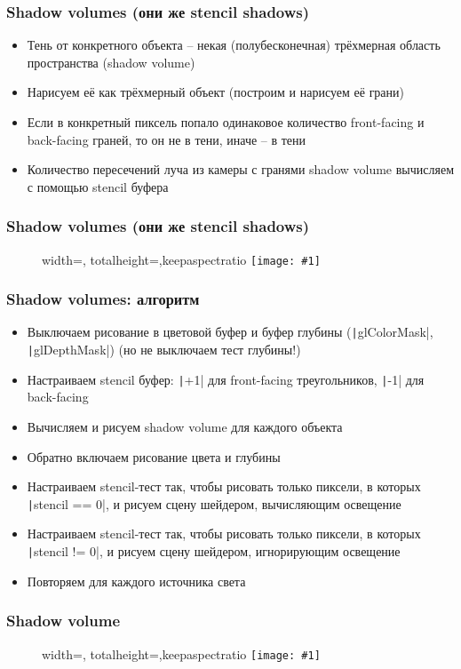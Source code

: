 \documentclass[10pt]{beamer}
\newcommand{\slideimage}[1]{
  \begin{figure}
    \begin{adjustbox}{width=\textwidth, totalheight=\textheight-2\baselineskip-2\baselineskip,keepaspectratio}
      \texttt{[image: \#1]}
    \end{adjustbox}
  \end{figure}
}
\begin{document}
\begin{frame}[fragile]
\frametitle{Shadow volumes (они же stencil shadows)}
\begin{itemize}
\item Тень от конкретного объекта -- некая (полубесконечная) трёхмерная область пространства (shadow volume)
\pause
\item Нарисуем её как трёхмерный объект (построим и нарисуем её грани)
\pause
\item Если в конкретный пиксель попало одинаковое количество front-facing и back-facing граней, то он не в тени, иначе -- в тени
\pause
\item Количество пересечений луча из камеры с гранями shadow volume вычисляем с помощью stencil буфера
\end{itemize}
\end{frame}

\begin{frame}[fragile]
\frametitle{Shadow volumes (они же stencil shadows)}
\slideimage{shadow-volumes-scheme.png}
\end{frame}

\begin{frame}[fragile]
\frametitle{Shadow volumes: алгоритм}
\begin{itemize}
\item Выключаем рисование в цветовой буфер и буфер глубины (\texttt|glColorMask|, \texttt|glDepthMask|) (но не выключаем тест глубины!)
\pause
\item Настраиваем stencil буфер: \texttt|+1| для front-facing треугольников, \texttt|-1| для back-facing
\pause
\item Вычисляем и рисуем shadow volume для каждого объекта
\pause
\item Обратно включаем рисование цвета и глубины
\pause
\item Настраиваем stencil-тест так, чтобы рисовать только пиксели, в которых \texttt|stencil == 0|, и рисуем сцену шейдером, вычисляющим освещение
\pause
\item Настраиваем stencil-тест так, чтобы рисовать только пиксели, в которых \texttt|stencil != 0|, и рисуем сцену шейдером, игнорирующим освещение
\pause
\item Повторяем для каждого источника света
\end{itemize}
\end{frame}

\begin{frame}[fragile]
\frametitle{Shadow volume}
\slideimage{shadow-volume2.jpg}
\end{frame}
\end{document}
